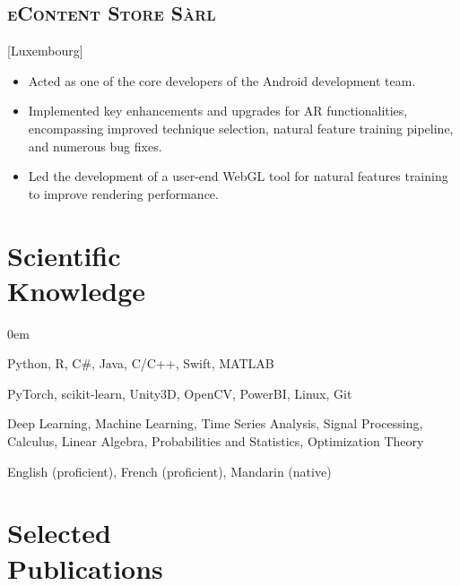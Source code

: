 \documentclass{mycv}
\begin{document}
\subsection{\scshape eContent Store S\`arl}[Luxembourg]

\begin{positions}
\end{positions}

\begin{itemize}
  \itemsep 0em
  \item Acted as one of the core developers of the Android development team.
  \item Implemented key enhancements and upgrades for AR functionalities, encompassing improved technique selection, natural feature training pipeline, and numerous bug fixes.
  \item Led the development of a user-end WebGL tool for natural features training to improve rendering performance.
\end{itemize}

\section{Scientific \\ Knowledge}

\begin{description}
  \itemsep 0em
  \item[Programming] Python, R, C\#, Java, C/C++, Swift, MATLAB
  \item[Frameworks \& Tools] PyTorch, scikit-learn, Unity3D, OpenCV, PowerBI, Linux, Git
  \item[Skills \& Expertise] Deep Learning, Machine Learning, Time Series Analysis, Signal Processing, Calculus, Linear Algebra, Probabilities and Statistics, Optimization Theory
  \item[Languages] English (proficient), French (proficient), Mandarin (native)
\end{description}

\section{Selected \\ Publications}

\vspace{-0.5em}
\end{document}

